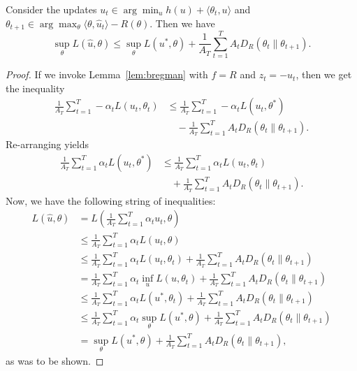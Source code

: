 \documentclass{article}
\begin{document}
\begin{proposition}
\label{prop:method-2}
Consider the updates $u_t \in \arg\min_{u} h(u) + \langle \theta_t, u \rangle$ 
and $\theta_{t+1} \in \arg\max_{\theta} \langle \theta, \hat{u}_t \rangle - R(\theta)$. 
Then we have 
\begin{equation}
\sup_{\theta} L(\hat{u}, \theta) \leq \sup_{\theta} L(u^*, \theta) + \frac{1}{A_T} \sum_{t=1}^T A_tD_{R}(\theta_t \| \theta_{t+1}).
\end{equation}
\end{proposition}
\begin{proof}
If we invoke Lemma~\ref{lem:bregman} with $f=R$ and $z_t=-u_t$, then we get 
the inequality
\begin{align}
\frac{1}{A_T} \sum_{t=1}^T -\alpha_t L(u_t, \theta_t) 
&\leq \frac{1}{A_T} \sum_{t=1}^T -\alpha_t L(u_t, \theta^*) \\
&\quad - \frac{1}{A_T} \sum_{t=1}^T A_tD_R(\theta_t \| \theta_{t+1}). \nonumber
\end{align}
Re-arranging yields
\begin{align}
\frac{1}{A_T }\sum_{t=1}^T \alpha_t L(u_t, \theta^*) 
&\leq \frac{1}{A_T} \sum_{t=1}^T \alpha_t L(u_t, \theta_t) \\
&\quad+ \frac{1}{A_T} \sum_{t=1}^T A_tD_R(\theta_t \| \theta_{t+1}). 
\end{align}
Now, we have the following string of inequalities:
\begin{align*}
L(\hat{u}, \theta) &= L\left(\frac{1}{A_T} \sum_{t=1}^T \alpha_t u_t, \theta\right) \\
 &\leq \frac{1}{A_T} \sum_{t=1}^T \alpha_t L(u_t, \theta) \\
 &\leq \frac{1}{A_T} \sum_{t=1}^T \alpha_t L(u_t, \theta_t) + \frac{1}{A_T} \sum_{t=1}^T A_t D_R(\theta_t \| \theta_{t+1}) \\
 &= \frac{1}{A_T} \sum_{t=1}^T \alpha_t \inf_{u} L(u, \theta_t) + \frac{1}{A_T} \sum_{t=1}^T A_tD_R(\theta_t \| \theta_{t+1}) \\
 &\leq \frac{1}{A_T} \sum_{t=1}^T \alpha_t L(u^*, \theta_t) + \frac{1}{A_T} \sum_{t=1}^T A_tD_R(\theta_t \| \theta_{t+1}) \\
 &\leq \frac{1}{A_T} \sum_{t=1}^T \alpha_t \sup_{\theta} L(u^*, \theta) + \frac{1}{A_T} \sum_{t=1}^T A_tD_R(\theta_t \| \theta_{t+1}) \\
 &= \sup_{\theta} L(u^*, \theta) + \frac{1}{A_T} \sum_{t=1}^T A_tD_R(\theta_t \| \theta_{t+1}),
\end{align*}
as was to be shown.
\end{proof}
\end{document}
